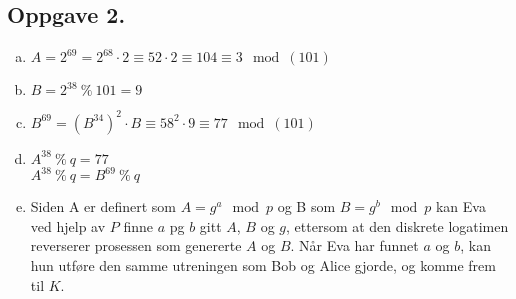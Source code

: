 \documentclass{article}
\begin{document}
\subsection*{Oppgave 2.}
\begin{enumerate}[(a)]
    \item {
        $A = 2^{69} = 2^{68} \cdot 2 \equiv 52 \cdot 2 \equiv 104 \equiv 3 \mod{(101)}$
    }
    \item {
        $B = 2^{38} \:\%\: 101 = 9$
    }
    \item {
        $B^{69} = (B^{34})^2 \cdot B \equiv 58^2 \cdot 9 \equiv 77 \mod{(101)}$
    }
    \item {
        $A^{38} \:\%\: q = 77$ \\
        $A^{38} \:\%\: q = B^{69} \:\%\: q$
    }
    \item {
        Siden A er definert som $A = g^{a} \mod p$ og B som $B = g^{b} \mod p$ kan Eva 
        ved hjelp av $P$ finne $a$ pg $b$ gitt $A$, $B$ og $g$, ettersom at den diskrete 
        logatimen reverserer prosessen som genererte $A$ og $B$. Når Eva har funnet $a$ og 
        $b$, kan hun utføre den samme utreningen som Bob og Alice gjorde, og komme frem til 
        $K$.
    }
\end{enumerate}
\end{document}
